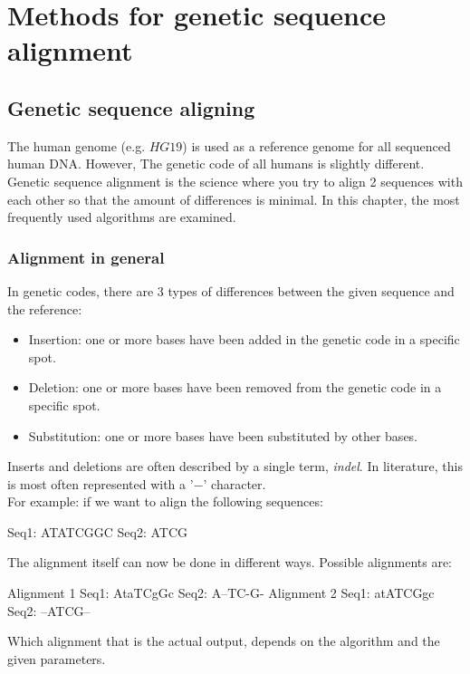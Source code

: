 
\chapter{Methods for genetic sequence alignment}
\label{ch:algoverzicht}


\section{Genetic sequence aligning}

The human genome (e.g. $HG19$) is used as a reference genome for all sequenced human DNA. However, The genetic code of all humans is slightly different. Genetic sequence alignment is the science where you try to align 2 sequences with each other so that the amount of differences is minimal. In this chapter, the most frequently used algorithms are examined.

\subsection{Alignment in general}

In genetic codes, there are 3 types of differences between the given sequence and the reference:

\begin{itemize}
	\item Insertion: one or more bases have been added in the genetic code in a specific spot.
	\item Deletion: one or more bases have been removed from the genetic code in a specific spot.
	\item Substitution: one or more bases have been substituted by other bases.
\end{itemize}

Inserts and deletions are often described by a single term, \emph{indel}. In literature, this is most often represented with a '$-$' character.\\

For example: if we want to align the following sequences:
\begin{lcverbatim}
	Seq1: ATATCGGC
	Seq2: ATCG
\end{lcverbatim}
The alignment itself can now be done in different ways. Possible alignments are:
\begin{lcverbatim}
	Alignment 1
	Seq1: AtaTCgGc
	Seq2: A--TC-G-
	Alignment 2
	Seq1: atATCGgc
	Seq2: --ATCG--
\end{lcverbatim}
Which alignment that is the actual output, depends on the algorithm and the given parameters.\\

